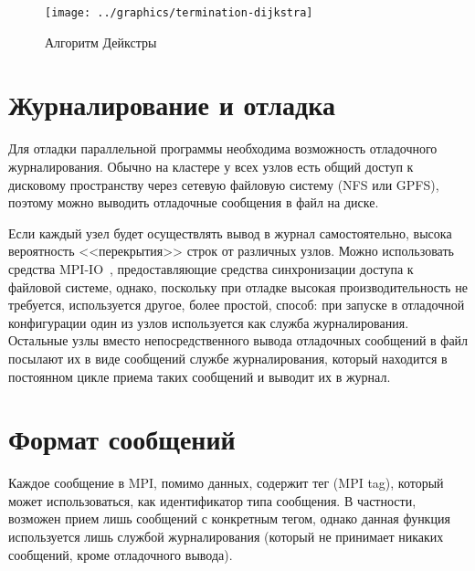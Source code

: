 \begin{figure}[htb]
  \centering
  \texttt{[image: ../graphics/termination-dijkstra]}  
  \caption{Алгоритм Дейкстры}
\label{fig:termination-dijkstra}
\end{figure}

\section{Журналирование и отладка}
\label{sec:mpi-logging}

Для отладки параллельной программы необходима возможность отладочного журналирования.
Обычно на кластере у всех узлов есть общий доступ к дисковому пространству через сетевую
файловую систему (NFS или GPFS), поэтому можно выводить отладочные сообщения в файл на
диске.

Если каждый узел будет осуществлять вывод в журнал самостоятельно, высока вероятность
<<перекрытия>> строк от различных узлов. Можно использовать средства MPI-IO~\cite{MPI},
предоставляющие средства синхронизации доступа к файловой системе, однако, поскольку при
отладке высокая производительность не требуется, используется другое, более простой,
способ: при запуске в отладочной конфигурации один из узлов используется как служба
журналирования. Остальные узлы вместо непосредственного вывода отладочных сообщений в файл
посылают их в виде сообщений службе журналирования, который находится в постоянном цикле
приема таких сообщений и выводит их в журнал.

\section{Формат сообщений}
\label{sec:message-format}

Каждое сообщение в MPI, помимо данных, содержит тег (MPI tag), который может
использоваться, как идентификатор типа сообщения. В частности, возможен прием лишь
сообщений с конкретным тегом, однако данная функция используется лишь службой
журналирования (который не принимает никаких сообщений, кроме отладочного вывода).

